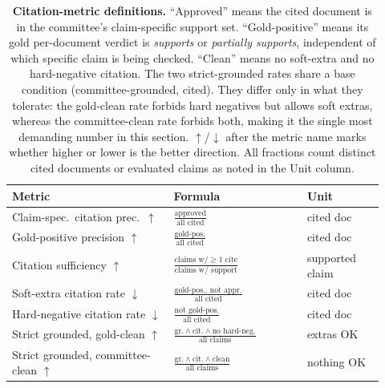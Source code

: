 \begin{table}[htbp]
\centering
{\tabstyle\setlength{\tabcolsep}{3pt}
\begin{tabular}[t]{@{}p{0.40\linewidth} p{0.33\linewidth} p{0.19\linewidth}@{}}\toprule
\textbf{Metric} & \textbf{Formula} & \textbf{Unit}\\\midrule
Claim-spec.\ citation prec.\ $\uparrow$ &
$\frac{\text{approved}}{\text{all cited}}$ &
cited doc\\[5pt]
Gold-positive precision $\uparrow$ &
$\frac{\text{gold-pos.}}{\text{all cited}}$ &
cited doc\\[5pt]
Citation sufficiency $\uparrow$ &
$\frac{\text{claims w/}\geq1\text{ cite}}{\text{claims w/ support}}$ &
supported claim\\[5pt]
Soft-extra citation rate $\downarrow$ &
$\frac{\text{gold-pos., not appr.}}{\text{all cited}}$ &
cited doc\\[5pt]
Hard-negative citation rate $\downarrow$ &
$\frac{\text{not gold-pos.}}{\text{all cited}}$ &
cited doc\\[5pt]
Strict grounded, gold-clean $\uparrow$ &
$\frac{\text{gr.}\wedge\text{cit.}\wedge\text{no hard-neg.}}{\text{all claims}}$ &
extras OK\\[5pt]
Strict grounded, committee-clean $\uparrow$ &
$\frac{\text{gr.}\wedge\text{cit.}\wedge\text{clean}}{\text{all claims}}$ &
nothing OK\\
\bottomrule\end{tabular}}
\caption{\textbf{Citation-metric definitions.} ``Approved'' means the cited
document is in the committee's claim-specific support set. ``Gold-positive''
means its gold per-document verdict is \textit{supports} or \textit{partially
supports}, independent of which specific claim is being checked. ``Clean''
means no soft-extra and no hard-negative citation. The two strict-grounded
rates share a base condition (committee-grounded, cited). They differ only in
what they tolerate: the gold-clean rate forbids hard negatives but allows
soft extras, whereas the committee-clean rate forbids both, making it the single most
demanding number in this section. $\uparrow$/$\downarrow$ after the metric
name marks whether higher or lower is the better direction. All fractions
count distinct cited documents or evaluated claims as noted in the Unit
column.}
\label{tab:citdefs}
\end{table}

